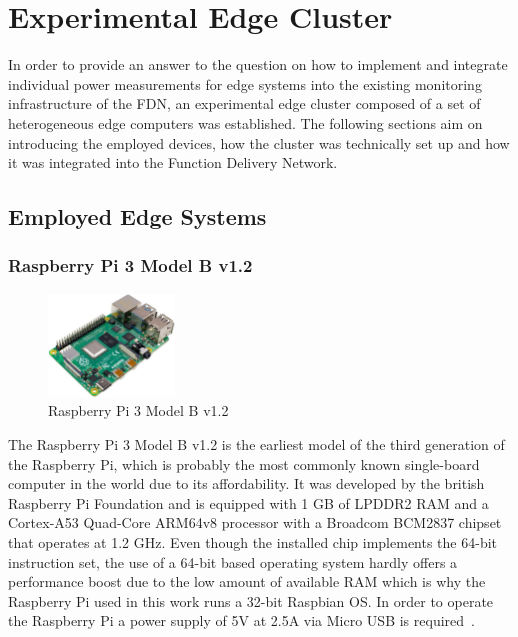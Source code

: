 \section{Experimental Edge Cluster}
In order to provide an answer to the question on how to implement and integrate individual power measurements for edge systems into the existing monitoring infrastructure of the FDN, an experimental edge cluster composed of a set of heterogeneous edge computers was established. The following sections aim on introducing the employed devices, how the cluster was technically set up and how it was integrated into the Function Delivery Network.

\subsection{Employed Edge Systems}
\subsubsection{Raspberry Pi 3 Model B v1.2}

\begin{figure}[h]
    \centering
    \includegraphics[width=0.30\textwidth]{./figures/mesh}
    \caption{Raspberry Pi 3 Model B v1.2}
    \label{fig:raspberry-pi}
\end{figure}


The Raspberry Pi 3 Model B v1.2 is the earliest model of the third generation of the Raspberry Pi, which is probably the most commonly known single-board computer in the world due to its affordability. It was developed by the british Raspberry Pi Foundation and is equipped with 1 GB of LPDDR2 RAM and a Cortex-A53 Quad-Core ARM64v8 processor with a Broadcom BCM2837 chipset that operates at 1.2 GHz. Even though the installed chip implements the 64-bit instruction set, the use of a 64-bit based operating system hardly offers a performance boost due to the low amount of available RAM which is why the Raspberry Pi used in this work runs a 32-bit Raspbian OS. In order to operate the Raspberry Pi a power supply of 5V at 2.5A via Micro USB is required~\parencite{raspberry-pi-intro}.


